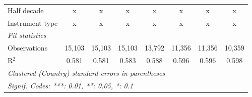 \begin{tabular}{lccccccc}
   Half decade                                                                          & x       & x             & x             & x             & x             & x             & x\\  
   Instrument type                                                                      & x       & x             & x             & x             & x             & x             & x\\  
   \midrule \emph{Fit statistics}\\
   Observations                                                                         & 15,103  & 15,103        & 15,103        & 13,792        & 11,356        & 11,356        & 10,359\\  
   R$^2$                                                                                & 0.581   & 0.581         & 0.583         & 0.588         & 0.596         & 0.596         & 0.598\\  
   \midrule
   \multicolumn{8}{l}{\emph{Clustered (Country) standard-errors in parentheses}}\\
   \multicolumn{8}{l}{\emph{Signif. Codes: ***: 0.01, **: 0.05, *: 0.1}}\\
\end{tabular}
\par\endgroup


